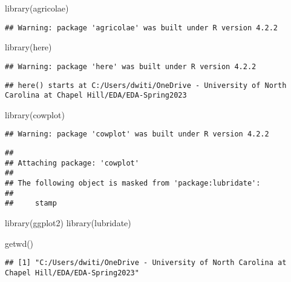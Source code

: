 \documentclass[
]{article}
\newenvironment{Shaded}{\begin{snugshade}}{\end{snugshade}}
\newcommand{\FunctionTok}[1]{\textcolor[rgb]{0.00,0.00,0.00}{#1}}
\newcommand{\NormalTok}[1]{#1}
\begin{document}
\begin{Shaded}
\begin{Highlighting}[]
\FunctionTok{library}\NormalTok{(agricolae)}
\end{Highlighting}
\end{Shaded}

\begin{verbatim}
## Warning: package 'agricolae' was built under R version 4.2.2
\end{verbatim}

\begin{Shaded}
\begin{Highlighting}[]
\FunctionTok{library}\NormalTok{(here)}
\end{Highlighting}
\end{Shaded}

\begin{verbatim}
## Warning: package 'here' was built under R version 4.2.2
\end{verbatim}

\begin{verbatim}
## here() starts at C:/Users/dwiti/OneDrive - University of North Carolina at Chapel Hill/EDA/EDA-Spring2023
\end{verbatim}

\begin{Shaded}
\begin{Highlighting}[]
\FunctionTok{library}\NormalTok{(cowplot)}
\end{Highlighting}
\end{Shaded}

\begin{verbatim}
## Warning: package 'cowplot' was built under R version 4.2.2
\end{verbatim}

\begin{verbatim}
## 
## Attaching package: 'cowplot'
## 
## The following object is masked from 'package:lubridate':
## 
##     stamp
\end{verbatim}

\begin{Shaded}
\begin{Highlighting}[]
\FunctionTok{library}\NormalTok{(ggplot2)}
\FunctionTok{library}\NormalTok{(lubridate)}

\FunctionTok{getwd}\NormalTok{()}
\end{Highlighting}
\end{Shaded}

\begin{verbatim}
## [1] "C:/Users/dwiti/OneDrive - University of North Carolina at Chapel Hill/EDA/EDA-Spring2023"
\end{verbatim}
\end{document}
